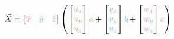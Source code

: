\documentclass[preview]{standalone}
\begin{document}
$$\vec{X} = \begin{bmatrix}\textcolor[HTML]{f59789}{\hat{x}}&\textcolor[HTML]{7dc98c}{\hat{y}}&\textcolor[HTML]{96b1fe}{\hat{z}}\end{bmatrix}\left(
\begin{bmatrix}\textcolor[HTML]{d2b057}{u}_{\textcolor[HTML]{f59789}{x}}\\\textcolor[HTML]{d2b057}{u}_{\textcolor[HTML]{7dc98c}{y}}\\\textcolor[HTML]{d2b057}{u}_{\textcolor[HTML]{96b1fe}{z}}\end{bmatrix}\textcolor[HTML]{d2b057}{a} +
\begin{bmatrix}\textcolor[HTML]{43c8dc}{v}_{\textcolor[HTML]{f59789}{x}}\\\textcolor[HTML]{43c8dc}{v}_{\textcolor[HTML]{7dc98c}{y}}\\\textcolor[HTML]{43c8dc}{v}_{\textcolor[HTML]{96b1fe}{z}}\end{bmatrix}\textcolor[HTML]{43c8dc}{b} +
\begin{bmatrix}\textcolor[HTML]{dd99d8}{w}_{\textcolor[HTML]{f59789}{x}}\\\textcolor[HTML]{dd99d8}{w}_{\textcolor[HTML]{7dc98c}{y}}\\\textcolor[HTML]{dd99d8}{w}_{\textcolor[HTML]{96b1fe}{z}}\end{bmatrix}\textcolor[HTML]{dd99d8}{c}
\right)$$
\end{document}
